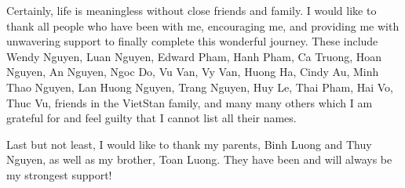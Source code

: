 Certainly, life is meaningless without close friends and family. I would like to
thank all people who have been with me, encouraging me, and providing me with
unwavering support to finally complete this wonderful journey. These include Wendy Nguyen,
Luan Nguyen, Edward Pham, Hanh Pham, Ca Truong, Hoan Nguyen, An Nguyen, Ngoc Do,
Vu Van, Vy Van, Huong Ha, Cindy Au, Minh Thao Nguyen, Lan Huong Nguyen, Trang
Nguyen, Huy Le, Thai Pham, Hai Vo, Thuc Vu, friends in the VietStan family, and
many many others which I am grateful for and feel guilty that I cannot list all their names.

Last but not least, I would like to
thank my parents, Binh Luong and Thuy Nguyen, as well as my brother, Toan
Luong. They have been and will always be my strongest support!

